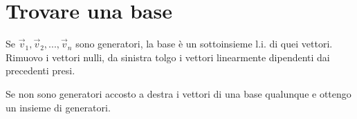 \section{Trovare una base}
Se $\vec{v}_1, \vec{v}_2, ..., \vec{v}_n$ sono generatori, la base è un sottoinsieme l.i. di quei vettori.
Rimuovo i vettori nulli, da sinistra tolgo i vettori linearmente dipendenti dai precedenti presi.

Se non sono generatori accosto a destra i vettori di una base qualunque e ottengo un insieme di generatori.
